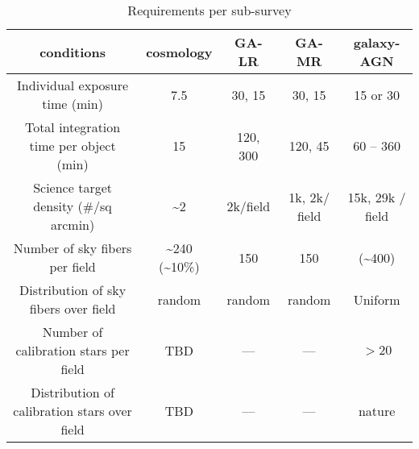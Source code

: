 \documentclass[a4paper,notitlepage]{article}
\begin{document}
\begin{table}[htb]
\begin{minipage}{\textwidth}
\renewcommand{\footnoterule}{}
\caption{Requirements per sub-survey}
\label{tab:sciops-scireq-subsvy}
\begin{center}
\begin{tabular}{c|c|c|c|c}
conditions & cosmology & GA-LR & GA-MR & galaxy-AGN \\ \hline
\hline
Individual exposure time (min) & 7.5 & 
  30\footnotemark[1], 15\footnotemark[2] & 
  30\footnotemark[3], 15\footnotemark[4] & 
  15 or 30 \footnotemark[5] \\
\hline
Total integration time per object (min) & 15 & 
  120\footnotemark[6], 300\footnotemark[7]  &
  120\footnotemark[8], 45\footnotemark[9]  &
  60 -- 360 \footnotemark[10] \\
\hline
Science target density (\#/sq arcmin) & 
  \textasciitilde 2 \footnotemark[11] & 
  2k/field \footnotemark[12] & 
  1k\footnotemark[13], 2k\footnotemark[14] / field & 
  15k, 29k / field \footnotemark[15] \\
\hline
Number of sky fibers per field & \textasciitilde 240 (\textasciitilde 10\%) 
  \footnotemark[16] & 150 & 150 & (\textasciitilde 400) \footnotemark[17] \\
\hline
Distribution of sky fibers over field & random 
  \footnotemark[18] & random & random & Uniform \\
\hline
Number of calibration stars per field & TBD & --- \footnotemark[19] & --- & 
  $>20$ \footnotemark[20] \\
\hline
Distribution of calibration stars over field & TBD & --- & --- & nature \\
\end{tabular}
\renewcommand{\thempfootnote}{\arabic{mpfootnote}}
\end{center}
\end{minipage}
\end{table}
\end{document}
